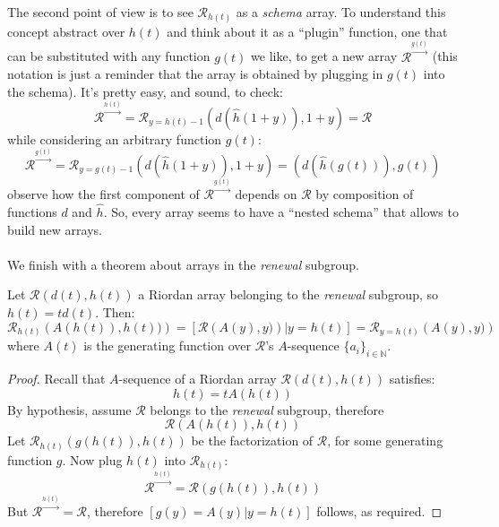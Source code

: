 The second point of view is to see $\mathcal{R}_{h(t)}$ as a \emph{schema} array.
To understand this concept abstract over $h(t)$ and think about it as a ``plugin''
function, one that can be substituted with any function $g(t)$ we like, to get a new array
$\mathcal{R}^{\stackrel{g(t)}{\rightarrow}}$ (this notation is just a reminder that the array is obtained
by plugging in $g(t)$ into the schema). It's pretty easy, and sound, to check:
\begin{displaymath}
    \mathcal{R}^{\stackrel{h(t)}{\rightarrow}} = \mathcal{R}_{y=h(t)-1}\left( d(\hat{h}(1+y)), 1+y \right) = \mathcal{R}
\end{displaymath}
while considering an arbitrary function $g(t)$:
\begin{displaymath}
    \mathcal{R}^{\stackrel{g(t)}{\rightarrow}} = \mathcal{R}_{y=g(t)-1}\left( d(\hat{h}(1+y)), 1+y \right) = 
    \left( d(\hat{h}(g(t))), g(t) \right) 
\end{displaymath}
observe how the first component of $\mathcal{R}^{\stackrel{g(t)}{\rightarrow}}$ depends on
$\mathcal{R}$ by composition of functions $d$ and $\hat{h}$. So, every array seems to have
a ``nested schema'' that allows to build new arrays.
\\\\
We finish with a theorem about arrays in the \emph{renewal} subgroup.

\begin{theorem}
    Let $\mathcal{R}\left(d(t), h(t)\right)$ a Riordan array belonging
    to the \emph{renewal} subgroup, so $h(t)=td(t)$. Then:
    \begin{displaymath}
        \mathcal{R}_{h(t)}\left(A(h(t)), h(t))\right)=
        \left[\left.\mathcal{R}\left(A(y), y)\right)\right|y=h(t)\right] =
        \mathcal{R}_{y=h(t)}\left(A(y), y)\right)
    \end{displaymath}
    where $A(t)$ is the generating function over $\mathcal{R}$'s $A$-sequence 
    $\lbrace a_i \rbrace_{i\in\mathbb{N}}$. 
\end{theorem}

\begin{proof}
    Recall that $A$-sequence of a Riordan array $\mathcal{R}\left(d(t), h(t)\right)$
    satisfies:
    \begin{displaymath}
        h(t)=tA(h(t))
    \end{displaymath}
    By hypothesis, assume $\mathcal{R}$ belongs to the \emph{renewal} subgroup, therefore
    \begin{displaymath}
        \mathcal{R}\left(A(h(t)), h(t)\right)
    \end{displaymath}
    Let $\mathcal{R}_{h(t)}\left(g(h(t)), h(t)\right)$ be the factorization of $\mathcal{R}$,
    for some generating function $g$. Now plug $h(t)$ into $\mathcal{R}_{h(t)}$:
    \begin{displaymath}
        \mathcal{R}^{\stackrel{h(t)}{\rightarrow}} =
            \mathcal{R}\left(g(h(t)), h(t)\right)
    \end{displaymath}
    But $\mathcal{R}^{\stackrel{h(t)}{\rightarrow}} = \mathcal{R}$, therefore 
    $[g(y)=A(y)|y=h(t)]$ follows, as required.

\end{proof}

